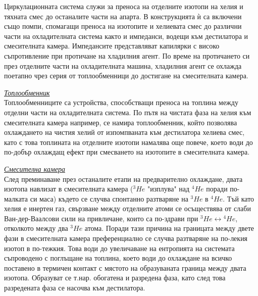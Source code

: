     Циркулационната система служи за преноса на отделните изотопи на хелия и тяхната смес до останалите части на апарта. В конструкцията ѝ са включени също помпи, спомагащи преноса на
    изотопите и хелиевата смес до различни части на охладителната система както и импеданси, водещи към дестилатора и смесителната камера. Импедансите представляват капилярки с
    високо съпротивление при протичане на хладилния агент. По време на протичането си през отделните части на охладителната машина, хладилния агент се охлажда поетапно чрез серия от
    топлообменници до достигане на смесителната камера. \cite{craig2004hitchhiker}

    \vspace{3mm}

    \normalsize{\textit{\underline{Топлообменник}}}\\

    Топлообменниците са устройства, способстващи преноса на топлина между отделни части на охладителната система. По пътя на чистата фаза на хелия към смесителната камера например,
    се намира топлообменник, който позволява охлаждането на чистия хелий от изпомпваната към дестилатора хелиева смес, като с това топлината на отделните изотопи намалява още повече,
    което води до по-добър охлаждащ ефект при смесването на изотопите в смесителната камера.

    \vspace{3mm}

    \normalsize{\textit{\underline{Смесителна камера}}}\\

    След преминаване през останалите етапи на предварително охлаждане, двата изотопа навлизат в смесителната камера ($^{3}He$ "изплува" над $^{4}He$ поради по-малката си маса)
    където се случва спонтанно разтваряне на $^{3}He$ в $^{4}He$. Тъй като хелия е инертен газ, свързване между отделните атоми се осъществява от слаби Ван-дер-Ваалсови сили на привличане,
    които са по-здрави при $^{3}He \leftrightarrow {^{4}He}$, отколкото между два $^{3}He$ атома. Поради тази причина на границата между двете фази в смесителната камера преференциално се случва разтваряне
    на по-лекия изотоп в по-тежкия. Това води до увеличаване на ентропията на системата съпроводено с поглъщане на топлина, което води до охлаждане на всичко поставено в термичен
    контакт с мястото на образуваната граница между двата изотопа. Образуват се т.нар. обогатена и разредена фаза, като след това разредената фаза се насочва към дестилатора.

